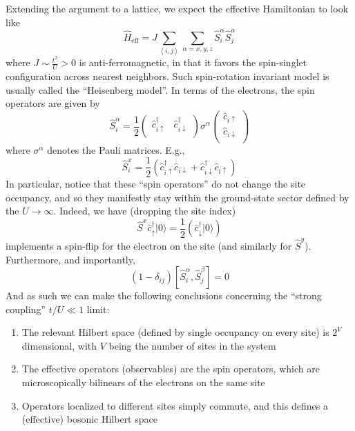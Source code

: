 Extending the argument to a lattice, we expect the effective Hamiltonian to look like
\[ \hat{H}_{\mathrm{eff}}=J\sum_{\left< i,j \right>}{\sum_{\alpha =x,y,z}{\hat{S}_{i}^{\alpha}\hat{S}_{j}^{\alpha}}}\]
where $J\sim \frac{t^2}{U}>0$ is anti-ferromagnetic, in that it favors the spin-singlet configuration across nearest neighbors. Such spin-rotation invariant model is usually called the ``Heisenberg model''. In terms of the electrons, the spin operators are given by
\[ \hat{S}_{i}^{\alpha}=\frac{1}{2}\left( \begin{matrix}
	\hat{c}_{i\uparrow}^{\dagger}&		\hat{c}_{i\downarrow}^{\dagger}\\
\end{matrix} \right) \sigma ^{\alpha}\left( \begin{array}{c}
	\hat{c}_{i\uparrow}\\
	\hat{c}_{i\downarrow}\\
\end{array} \right) \]
where $\sigma^\alpha$ denotes the Pauli matrices. E.g.,
\[ \hat{S}_{i}^{x}=\frac{1}{2}\left( \hat{c}_{i\uparrow}^{\dagger}\hat{c}_{i\downarrow}+\hat{c}_{i\downarrow}^{\dagger}\hat{c}_{i\uparrow} \right) \]
In particular, notice that these ``spin operators'' do not change the site occupancy, and so they manifestly stay within the ground-state sector defined by the $U\to\infty$. Indeed, we have (dropping the site index)
\[ \hat{S}^x\hat{c}_{\uparrow}^{\dagger}|0\rangle =\frac{1}{2}\left( \hat{c}_{\downarrow}^{\dagger}|0\rangle \right) \]
implements a spin-flip for the electron on the site (and similarly for $\hat{S}^y$). Furthermore, and importantly,
\[ \left( 1-\delta _{ij} \right) \left[ \hat{S}_{i}^{\alpha},\hat{S}_{j}^{\beta} \right] =0\]
And as such we can make the following conclusions concerning the ``strong coupling'' $t/U\ll 1$ limit:
\begin{enumerate}
    \item The relevant Hilbert space (defined by single occupancy on every site) is $2^V$ dimensional, with $V$ being the number of sites in the system
    \item The effective operators (observables) are the spin operators, which are microscopically bilinears of the electrons on the same site
    \item Operators localized to different sites simply commute, and this defines a (effective) bosonic Hilbert space
\end{enumerate}

